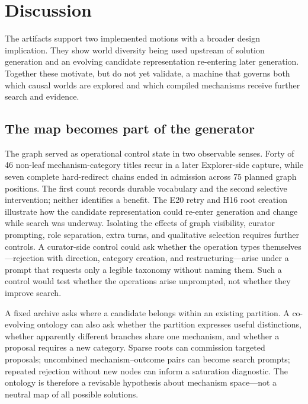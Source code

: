 \documentclass[11pt,a4paper]{article}
\begin{document}
\section{Discussion}

The artifacts support two implemented motions with a broader design implication. They show world diversity being used upstream of solution generation and an evolving candidate representation re-entering later generation. Together these motivate, but do not yet validate, a machine that governs both which causal worlds are explored and which compiled mechanisms receive further search and evidence.

\subsection{The map becomes part of the generator}
\label{sec:map-generator}

The graph served as operational control state in two observable senses. Forty of 46 non-leaf mechanism-category titles recur in a later Explorer-side capture, while seven complete hard-redirect chains ended in admission across 75 planned graph positions. The first count records durable vocabulary and the second selective intervention; neither identifies a benefit. The E20 retry and H16 root creation illustrate how the candidate representation could re-enter generation and change while search was underway. Isolating the effects of graph visibility, curator prompting, role separation, extra turns, and qualitative selection requires further controls. A curator-side control could ask whether the operation types themselves---rejection with direction, category creation, and restructuring---arise under a prompt that requests only a legible taxonomy without naming them. Such a control would test whether the operations arise unprompted, not whether they improve search.

A fixed archive asks where a candidate belongs within an existing partition. A co-evolving ontology can also ask whether the partition expresses useful distinctions, whether apparently different branches share one mechanism, and whether a proposal requires a new category. Sparse roots can commission targeted proposals; uncombined mechanism--outcome pairs can become search prompts; repeated rejection without new nodes can inform a saturation diagnostic. The ontology is therefore a revisable hypothesis about mechanism space---not a neutral map of all possible solutions.
\end{document}
